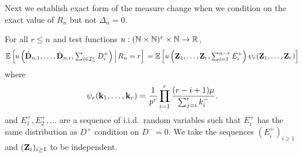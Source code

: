Next we establish exact form of the measure change when we condition on the exact value of $R_n$ but not $\Delta_n = 0$.

\begin{lemma}
    \label{lem:exact-measure-change-no-conditioning}
    For all $r \leq n$ and test functions $u: ({\mathbb N} \times {\mathbb N})^r \times {\mathbb N} \to {\mathbb R}$,
    \begin{equation*}
        {\mathbb E} \left[ u\left( 
            \hat{{\mathbf D}}_{n, 1}, \ldots, \hat{{\mathbf D}}_{n, r}, \textstyle \sum_{i \in {\mathcal I}_n^c} D_i^+
        \right) \,\middle\vert\, R_n = r \right] \\
        =
        {\mathbb E} \left[
            u\left( {\mathbf Z}_1, \ldots, {\mathbf Z}_r, \textstyle \sum_{i = 1}^{n-r} E_i^+ \right)
            \psi_r({\mathbf Z}_1, \ldots, {\mathbf Z}_r)
        \right]
    \end{equation*}
    where
    \begin{equation*}
        \psi_r({\mathbf k}_1, \ldots, {\mathbf k}_r) =
        \frac{1}{p^r} \prod_{i=1}^r \frac{(r - i + 1)\mu}{\sum_{j=i}^r k_i^-}.
    \end{equation*}
    and $E_1^+, E_2^+, \ldots$ are a sequence of i.i.d.\ random variables such that $E_i^+$ has the same distribution as $D^+$ condition on $D^- = 0$. We take the sequences $(E_i^+)_{i \geq 1}$ and $({\mathbf Z}_i)_{i \geq 1}$ to be independent.
\end{lemma}

